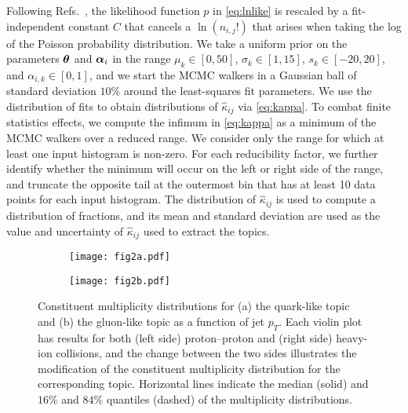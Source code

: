 \documentclass[aps,prl,twocolumn,preprintnumbers,showpacs,floatfix,nofootinbib]{revtex4-1}
\newcommand*{\V}[1]{\ensuremath\bm{#1}}
\begin{document}
%
Following Refs.~\cite{Baker:1983tu,Tanabashi:2018oca}, the likelihood function $p$ in \cref{eq:lnlike} is rescaled by a fit-independent constant $C$ that cancels a $\ln(n_{i,j}!)$ that arises when taking the log of the Poisson probability distribution.
%
We take a uniform prior on the parameters $\V{\theta}$ and $\V{\alpha}_i$ in the range $\mu_k \in [0,50]$, $\sigma_k \in [1, 15]$, $s_k \in [-20,20]$, and $\alpha_{i, k} \in [0, 1]$, and we start the MCMC walkers in a Gaussian ball of standard deviation $10\%$ around the least-squares fit parameters.
%
We use the distribution of fits to obtain distributions of $\hat{\kappa}_{i j}$ via \cref{eq:kappa}.
%
To combat finite statistics effects, we compute the infimum in \cref{eq:kappa} as a minimum of the MCMC walkers over a reduced range.
%
We consider only the range for which at least one input histogram is non-zero.
%
For each reducibility factor, we further identify whether the minimum will occur on the left or right side of the range, and truncate the opposite tail at the outermost bin that has at least 10 data points for each input histogram.
%
The distribution of $\hat{\kappa}_{i j}$ is used to compute a distribution of fractions, and its mean and standard deviation are used as the value and uncertainty of $\hat{\kappa}_{i j}$ used to extract the topics.

\begin{figure*}
\begin{subfigure}[b]{0.45\linewidth}
	\centering
	\texttt{[image: fig2a.pdf]}
	\caption{}
	\label{fig:dist_mod_Q}
\end{subfigure}\hspace{0.05\textwidth}
\begin{subfigure}[b]{0.45\linewidth}
	\centering
	\texttt{[image: fig2b.pdf]}
	\caption{}
	\label{fig:dist_mod_G}
\end{subfigure}
\caption{
%
Constituent multiplicity distributions for (a) the quark-like topic and (b) the gluon-like topic as a function of jet $p_T$.
%
Each violin plot has results for both (left side) proton--proton and (right side) heavy-ion collisions, and the change between the two sides illustrates the modification of the constituent multiplicity distribution for the corresponding topic.
%
Horizontal lines indicate the median (solid) and $16\%$ and $84\%$ quantiles (dashed) of the multiplicity distributions.
}
\label{fig:dist_mod}
\end{figure*}
\end{document}

